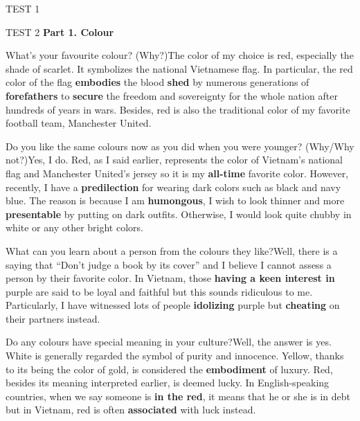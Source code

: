 \begin{glossarymc}[Cambridge 5]
\begin{test}{TEST 1}
    \end{test}

    \begin{test}{TEST 2}
    \noindent
    \textbf{Part 1. Colour}
    \begin{qa}{What's your favourite colour? (Why?)}{The color of my choice is red, especially the shade of scarlet. It symbolizes the national Vietnamese flag. In particular, the red color of the flag \textbf{embodies} the blood \textbf{shed} by numerous generations of \textbf{forefathers} to \textbf{secure} the freedom and sovereignty for the whole nation after hundreds of years in wars. Besides, red is also the traditional color of my favorite football team, Manchester United.}
    \end{qa}

    \begin{qa}{Do you like the same colours now as you did when you were younger? (Why/Why not?)}{Yes, I do. Red, as I said earlier, represents the color of Vietnam's national flag and Manchester United's jersey so it is my \textbf{all-time} favorite color. However, recently, I have a \textbf{predilection} for wearing dark colors such as black and navy blue. The reason is because I am \textbf{humongous}, I wish to look thinner and more \textbf{presentable} by putting on dark outfits. Otherwise, I would look quite chubby in white or any other bright colors.}
    \end{qa}

    \begin{qa}{What can you learn about a person from the colours they like?}{Well, there is a saying that “Don't judge a book by its cover” and I believe I cannot assess a person by their favorite color. In Vietnam, those \textbf{having a keen interest in} purple are said to be loyal and faithful but this sounds ridiculous to me. Particularly, I have witnessed lots of people \textbf{idolizing} purple but \textbf{cheating} on their partners instead.}
    \end{qa}

    \begin{qa}{Do any colours have special meaning in your culture?}{Well, the answer is yes. White is generally regarded the symbol of purity and innocence. Yellow, thanks to its being the color of gold, is considered the \textbf{embodiment} of luxury. Red, besides its meaning interpreted earlier, is deemed lucky. In English-speaking countries, when we say someone is \textbf{in the red}, it means that he or she is in debt but in Vietnam, red is often \textbf{associated} with luck instead.}
    \end{qa}


\end{test}
\end{glossarymc}
